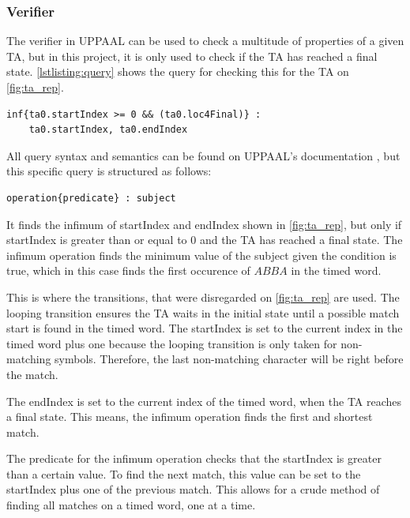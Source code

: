 \subsubsection{Verifier}\label{subsubsec:verifier}
The verifier in UPPAAL can be used to check a multitude of properties of a given TA, but in this project, it is only used to check if the TA has reached a final state. \cref{lstlisting:query} shows the query for checking this for the TA on \cref{fig:ta_rep}.

\vspace{0.75em}
\begin{lstlisting}[basicstyle=\scriptsize]
    inf{ta0.startIndex >= 0 && (ta0.loc4Final)} : 
    ta0.startIndex, ta0.endIndex
\end{lstlisting}
\label{lstlisting:query}
\vspace{0.75em}

All query syntax and semantics can be found on UPPAAL's documentation \cite{UPPAAL}, but this specific query is structured as follows:
\begin{lstlisting}[basicstyle=\scriptsize]
    operation{predicate} : subject
\end{lstlisting}
It finds the infimum of startIndex and endIndex shown in \cref{fig:ta_rep}, but only if startIndex is greater than or equal to 0 and the TA has reached a final state. The infimum operation finds the minimum value of the subject given the condition is true, which in this case finds the first occurence of $ABBA$ in the timed word.

\vspace{.5\baselineskip plus 2pt}
This is where the transitions, that were disregarded on \cref{fig:ta_rep} are used. The looping transition ensures the TA waits in the initial state until a possible match start is found in the timed word. The startIndex is set to the current index in the timed word plus one because the looping transition is only taken for non-matching symbols. Therefore, the last non-matching character will be right before the match.

\vspace{.5\baselineskip plus 2pt}
The endIndex is set to the current index of the timed word, when the TA reaches a final state. This means, the infimum operation finds the first and shortest match.

\vspace{.5\baselineskip plus 2pt}
The predicate for the infimum operation checks that the startIndex is greater than a certain value. To find the next match, this value can be set to the startIndex plus one of the previous match. This allows for a crude method of finding all matches on a timed word, one at a time.

